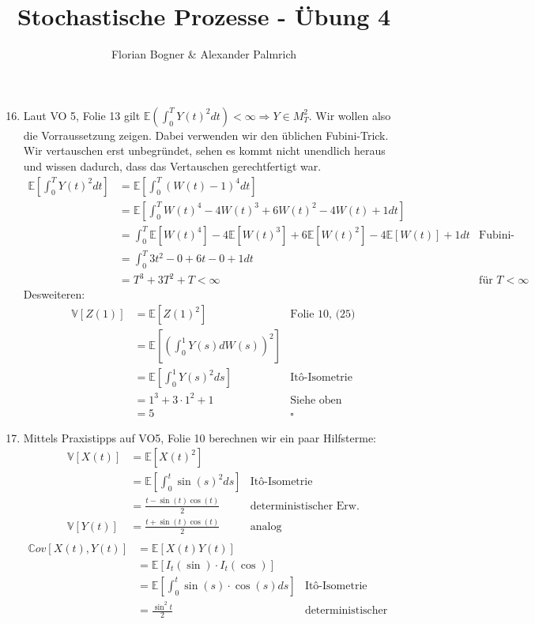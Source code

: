 \documentclass[a4paper,11pt,notitlepage,fullpage]{article}
\newcommand{\E}{\mathbb E}
\newcommand{\Ee}[1]{\mathbb E\left[#1\right]}
\newcommand{\Vv}[1]{\mathbb V\left[#1\right]}
\newcommand{\Cov}[1]{\mathbb Cov\left[#1\right]}
\begin{document}
\author{Florian Bogner \& Alexander Palmrich}
\title{Stochastische Prozesse - Übung 4}
\maketitle

\begin{enumerate}
\setcounter{enumi}{15}

\item Laut VO 5, Folie 13 gilt $\E(\int_0^T Y(t)^2 dt) < \infty \Rightarrow Y \in M_T^2$. Wir wollen also die Vorraussetzung zeigen. Dabei verwenden wir den üblichen Fubini-Trick. Wir vertauschen erst unbegründet, sehen es kommt nicht unendlich heraus und wissen dadurch, dass das Vertauschen gerechtfertigt war.
\begin{align*}
\Ee{\int_0^T Y(t)^2 dt} &= \Ee{\int_0^T (W(t)-1)^4 dt} \\
&= \Ee{\int_0^T W(t)^4 - 4W(t)^3 + 6W(t)^2 - 4W(t) + 1 dt} \\
&= \int_0^T \Ee{W(t)^4} - 4\Ee{W(t)^3} + 6\Ee{W(t)^2} - 4\Ee{W(t)} + 1 dt &\text{Fubini-Trick} \\
&= \int_0^T 3t^2 - 0 + 6t - 0 + 1 dt \\
&= T^3 + 3T^2 + T < \infty &\text{für $T < \infty$}
\end{align*}
Desweiteren:
\begin{align*}
\Vv{Z(1)} &= \Ee{Z(1)^2} &\text{Folie 10, (25)} \\
&= \Ee{\left(\int_0^1 Y(s) dW(s)  \right)^2} \\
&= \Ee{\int_0^1 Y(s)^2  ds} &\text{Itô-Isometrie} \\
&= 1^3 + 3\cdot1^2 + 1  &\text{Siehe oben} \\
&= 5 &\square
\end{align*}


\item Mittels Praxistipps auf VO5, Folie 10 berechnen wir ein paar Hilfsterme:
\begin{align*}
\Vv{X(t)} &= \Ee{X(t)^2} \\
&= \Ee{\int_0^t \sin(s)^2 ds} &\text{Itô-Isometrie} \\
&= \frac{t-\sin(t)\cos(t)}{2} &\text{deterministischer Erw.} \\
\Vv{Y(t)} &= \frac{t+\sin(t)\cos(t)}{2} &\text{analog}\\
\end{align*}
\begin{align*}
\Cov{X(t), Y(t)} &= \Ee{X(t) Y(t)}\\
&= \Ee{I_t (\sin) \cdot I_t (\cos)}\\
&= \Ee{\int_0^t \sin(s) \cdot \cos(s) ds}&\text{Itô-Isometrie} \\
&= \frac{\sin^2t}{2} &\text{deterministischer Erw.} \\
\end{align*}


\end{enumerate}
\end{document}
